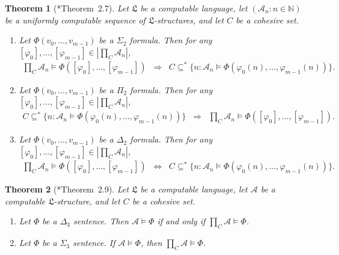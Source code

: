 \documentclass[11pt,a4paper,reqno]{amsart}
\newtheorem{Theorem}{Theorem}[section]
\theoremstyle{definition}
\newcommand{\Imp}{\Rightarrow}
\newcommand{\Biimp}{\Leftrightarrow}
\newcommand{\Nb}{\mathbb{N}}
\newcommand{\mc}[1]{\mathcal{#1}}
\newcommand{\mf}[1]{\mathfrak{#1}}
\begin{document}
\begin{Theorem}[\cite{CohPowJournal}*{Theorem~2.7}]\label{thm-LosProdParam}
Let $\mf{L}$ be a computable language, let $(\mc{A}_n : n \in \Nb)$ be a uniformly computable sequence of $\mf{L}$-structures, and let $C$ be a cohesive set.
\begin{enumerate}[(1)]
\item\label{it-LosProdPramSig2} Let $\Phi(v_0, \dots, v_{m-1})$ be a $\Sigma_2$ formula.  Then for any $[\varphi_0], \dots, [\varphi_{m-1}] \in |\prod_C \mc{A}_n|$,
\begin{align*}
\prod\nolimits_C \mc{A}_n \models \Phi([\varphi_0], \dots, [\varphi_{m-1}]) \;\;\Imp\;\; C \subseteq^* \bigl\{n : \mc{A}_n \models \Phi(\varphi_0(n), \dots, \varphi_{m-1}(n))\bigr\}.
\end{align*}

\medskip

\item\label{it-LosProdPramPi2} Let $\Phi(v_0, \dots, v_{m-1})$ be a $\Pi_2$ formula.  Then for any $[\varphi_0], \dots, [\varphi_{m-1}] \in |\prod_C \mc{A}_n|$,
\begin{align*}
C \subseteq^* \bigl\{n : \mc{A}_n \models \Phi(\varphi_0(n), \dots, \varphi_{m-1}(n))\bigr\} \;\;\Imp\;\; \prod\nolimits_C \mc{A}_n \models \Phi([\varphi_0], \dots, [\varphi_{m-1}]).
\end{align*}

\medskip

\item\label{it-LosProdPramDelta2} Let $\Phi(v_0, \dots, v_{m-1})$ be a $\Delta_2$ formula.  Then for any $[\varphi_0], \dots, [\varphi_{m-1}] \in |\prod_C \mc{A}_n|$,
\begin{align*}
\prod\nolimits_C \mc{A}_n \models \Phi([\varphi_0], \dots, [\varphi_{m-1}]) \;\;\Biimp\;\; C \subseteq^* \bigl\{n : \mc{A}_n \models \Phi(\varphi_0(n), \dots, \varphi_{m-1}(n))\bigr\}.
\end{align*}
\end{enumerate}
\end{Theorem}

\begin{Theorem}[\cite{CohPowJournal}*{Theorem~2.9}]\label{thm-LosGeneral}
Let $\mf{L}$ be a computable language, let $\mc{A}$ be a computable $\mf{L}$-structure, and let $C$ be a cohesive set.

\begin{enumerate}[(1)]
\item\label{it-LosDelta3Sent} Let $\Phi$ be a $\Delta_3$ sentence.  Then $\mc{A} \models \Phi$ if and only if $\prod_C \mc{A} \models \Phi$.

\medskip

\item\label{it-LosSigma3Sent} Let $\Phi$ be a $\Sigma_3$ sentence.  If $\mc{A} \models \Phi$, then $\prod_C \mc{A} \models \Phi$.
\end{enumerate}
\end{Theorem}
\end{document}
